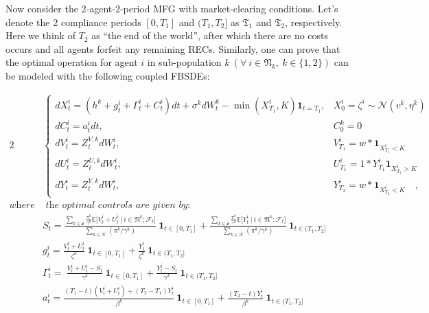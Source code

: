 \documentclass[a4paper,10pt]{article}
\newcommand{\1}{\mathbf{1}}
\begin{document}
Now consider the 2-agent-2-period MFG with market-clearing conditions.
Let's denote the 2 compliance periods \([0,T_1]\) and \((T_1,T_2]\) as
\(\mathfrak{T_1}\) and \(\mathfrak{T_2}\), respectively. Here we think
of \(T_2\) as ``the end of the world'', after which there are no costs
occurs and all agents forfeit any remaining RECs. Similarly, one can
prove that the optimal operation for agent \(i\) in sub-population
\(k~(\forall~i \in \mathfrak{N}_k,~k\in\lbrace{1,2\rbrace})\) can be
modeled with the following coupled FBSDEs:

\begin{alignat}{2}
    &\begin{cases}
        dX_t^{i} =(h^{k}+g_t^{i}+\Gamma_t^{i}+C_t^{i})dt + \sigma^{k}dW_t^{k} - \min\left(X_{T_1}^i,K\right)\mathbf{1}_{t=T_1},  &X_0^{i} = \zeta^{i} \sim \mathcal{N}(v^k,\eta^k)\\
        dC_t^{i} = a_t^{i}dt ,  &C_0^{k}=0 \\ 
        dV_t^{i} = Z_t^{V,k}dW_t^{i},  &V_{T_1}^{i}=w*\mathbf{1}_{X^i_{T_1}<K} \\
        dU_t^{i} = Z_t^{U,k}dW_t^{i},  &U_{T_1}^{i}=1*Y_{T_1}^i\mathbf{1}_{X^i_{T_1}>K}\\
        dY_t^{i} = Z_t^{Y,k}dW_t^{i},  &Y_{T_2}^{i}=w*\mathbf{1}_{X^i_{T_2}<K}\quad,
    \end{cases} \\
    \textit{where} &\textit{ the optimal controls are given by:}\\
    & S_t = \frac{\sum\limits_{k \in \mathcal{k}} {\frac{\pi^k}{\gamma^k}\mathbb{E}\big[ V_t^i +U_t^i ~|~ i \in \mathfrak{N}^k; \mathcal{F}_t \big]}}{\sum\limits_{k \in \mathcal{K}}{(\pi^k/\gamma^k)}} 
            ~\mathbf{1}_{t\in [0,T_1]} +
            \frac{\sum\limits_{k \in \mathcal{k}} {\frac{\pi^k}{\gamma^k}\mathbb{E}\big[ Y_t^i ~|~ i \in \mathfrak{N}^k; \mathcal{F}_t \big]}}{\sum\limits_{k \in \mathcal{K}}{(\pi^k/\gamma^k)}} 
            ~\mathbf{1}_{t\in (T_1,T_2]} \\
    & g_t^{i} = \frac{V_t^{i}+U_t^{i}}{\zeta^{k}} ~\mathbf{1}_{t\in [0,T_1]}
                + \frac{Y_t^{i}}{\zeta^{k}} ~\mathbf{1}_{t\in (T_1,T_2]} \\
    & \Gamma_t^{i} =\  \frac{V_t^{i}+U_t^{i}-S_t}{\gamma^{k}} ~\mathbf{1}_{t\in [0,T_1]}
                    + \frac{Y_t^{i}-S_t}{\gamma^{k}} ~\mathbf{1}_{t\in (T_1,T_2]} \\
    & a_t^{i} =\frac{(T_1-t)(V_t^{i}+U_t^{i})+(T_2-T_1)Y^i_t}{\beta^{k}} ~\mathbf{1}_{t\in [0,T_1]}
                + \frac{(T_2-t)Y_t^{i}}{\beta^{k}} ~\mathbf{1}_{t\in (T_1,T_2]} \\
\end{alignat}
\end{document}

